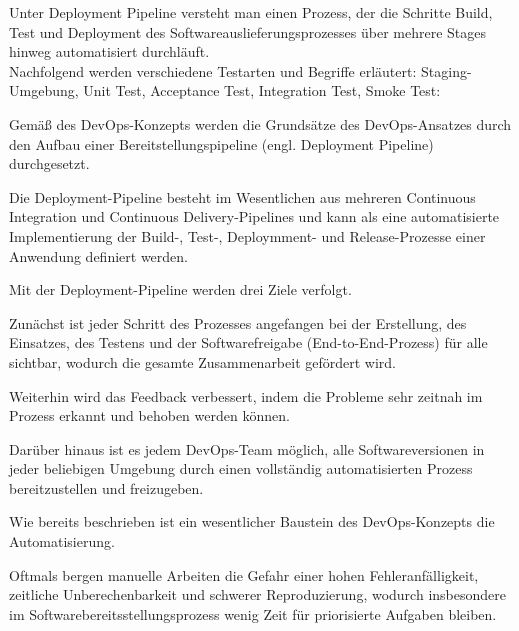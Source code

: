 Unter Deployment Pipeline versteht man einen Prozess, der die Schritte Build, Test und Deployment des Softwareauslieferungsprozesses über mehrere Stages hinweg automatisiert durchläuft.\\


Nachfolgend werden verschiedene Testarten und Begriffe erläutert: Staging-Umgebung, Unit Test, Acceptance Test, Integration Test, Smoke Test:




















Gemäß des DevOps-Konzepts werden die Grundsätze des DevOps-Ansatzes durch den Aufbau einer Bereitstellungspipeline (engl. Deployment Pipeline) durchgesetzt. 

Die Deployment-Pipeline besteht im Wesentlichen aus mehreren Continuous Integration und Continuous Delivery-Pipelines und kann als eine automatisierte Implementierung der Build-, Test-, Deploymment- und Release-Prozesse einer Anwendung definiert werden. 

Mit der Deployment-Pipeline werden drei Ziele verfolgt. \cite[S. 3 - 4]{humble_continuous_2011} 

Zunächst ist jeder Schritt des Prozesses angefangen bei der Erstellung, des Einsatzes, des Testens und der Softwarefreigabe (End-to-End-Prozess) für alle sichtbar, wodurch die gesamte Zusammenarbeit gefördert wird. 

Weiterhin wird das Feedback verbessert, indem die Probleme sehr zeitnah im Prozess erkannt und behoben werden können. 

Darüber hinaus ist es jedem DevOps-Team möglich, alle Softwareversionen in jeder beliebigen Umgebung durch einen vollständig automatisierten Prozess bereitzustellen und freizugeben.






Wie bereits beschrieben ist ein wesentlicher Baustein des DevOps-Konzepts die Automatisierung. 

Oftmals bergen manuelle Arbeiten die Gefahr einer hohen Fehleranfälligkeit, zeitliche Unberechenbarkeit und schwerer Reproduzierung, wodurch insbesondere im Softwarebereitsstellungsprozess wenig Zeit für priorisierte Aufgaben bleiben. 

